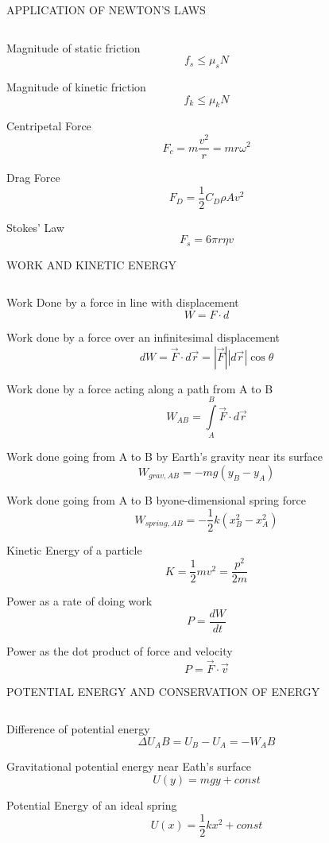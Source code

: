 \documentclass[12pt, letterpaper, twoside]{article}
\begin{document}
\newpage

APPLICATION OF NEWTON'S LAWS

$$ $$

Magnitude of static friction
$$f_s \leq \mu_s N$$


Magnitude of kinetic friction
$$f_k \leq \mu_k N$$


Centripetal Force
$$F_c = m \frac{v^2}{r} = mr\omega^2$$



Drag Force
$$F_D=\frac{1}{2} C_D \rho A v^2 $$


Stokes' Law
$$F_s = 6 \pi r \eta v $$








\newpage

WORK AND KINETIC ENERGY

$$ $$


Work Done by a force in line with displacement
$$ W = F \cdot d $$


Work done by a force over an infinitesimal displacement
$$ dW = \overrightarrow{F} \cdot d \overrightarrow{r} = | \overrightarrow{F} | | d \overrightarrow{r} | \cos \theta $$


Work done by a force acting along a path from A to B
$$ W_{AB} = \int\limits_A^B \overrightarrow{F} \cdot d \overrightarrow{r} $$


Work done going from A to B by Earth's gravity near its surface
$$ W_{grav,AB} = -mg(y_B - y_A) $$


Work done going from A to B byone-dimensional spring force
$$ W_{spring,AB} = - \frac{1}{2} k (x_B^2 - x_A^2) $$


Kinetic Energy of a particle
$$ K = \frac{1}{2} m v^2 = \frac{p^2}{2m} $$


Power as a rate of doing work
$$ P = \frac{dW}{dt} $$


Power as the dot product of force and velocity
$$ P = \overrightarrow{F} \cdot \overrightarrow{v} $$



\newpage

POTENTIAL ENERGY AND CONSERVATION OF ENERGY

$$ $$

Difference of potential energy
$$ \Delta U_AB = U_B - U_A = -W_AB $$


Gravitational potential energy near Eath's surface
$$ U(y) = mgy + const $$


Potential Energy of an ideal spring
$$  U(x) = \frac{1}{2} k x^2 + const $$
\end{document}
